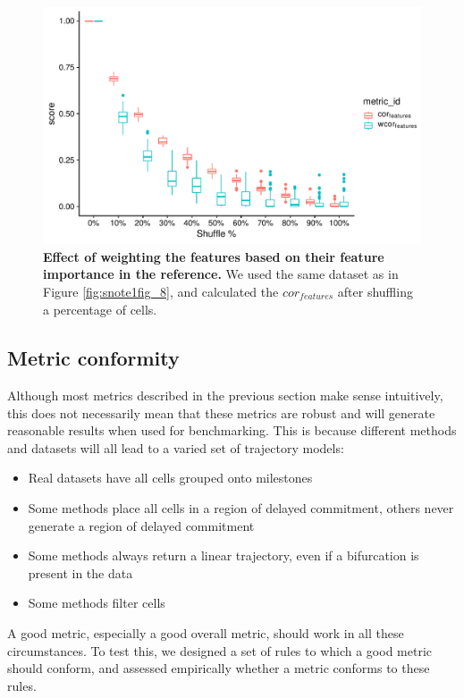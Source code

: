 \begin{figure}[htb!]
	\centering\includegraphics[width=\linewidth]{fig/snote1fig_10.pdf}
	\caption{
		\textbf{Effect of weighting the features based on their feature importance in the reference.} 
		We used the same dataset as in Figure \ref{fig:snote1fig_8}, and calculated the $\textit{cor}_{\textit{features}}$ after shuffling a percentage of cells.
	}
	\label{fig:snote1fig_10}
\end{figure}


\subsection{Metric conformity}

Although most metrics described in the previous section make sense intuitively, this does not necessarily mean that these metrics are robust and will generate reasonable results when used for benchmarking. This is because different methods and datasets will all lead to a varied set of trajectory models:

\begin{itemize}
	\item Real datasets have all cells grouped onto milestones
	\item Some methods place all cells in a region of delayed commitment, others never generate a region of delayed commitment
	\item Some methods always return a linear trajectory, even if a bifurcation is present in the data
	\item Some methods filter cells
\end{itemize}

A good metric, especially a good overall metric, should work in all these circumstances. To test this, we designed a set of rules to which a good metric should conform, and assessed empirically whether a metric conforms to these rules.

